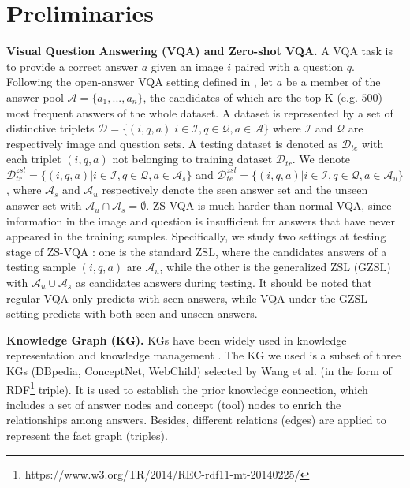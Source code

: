 \documentclass[runningheads]{llncs}
\newcommand{\cjy}[1]{{\color{black}#1}}
\newcommand{\jeff}[1]{{\color{black}#1}}
\begin{document}
\section{Preliminaries}
\noindent\textbf{Visual Question Answering (VQA) and Zero-shot VQA.} 
A VQA task is  to \jeff{provide} a correct answer $a$ given an image $i$ paired with a question $q$. 
Following the open-answer VQA setting defined in \cite{DBLP:conf/cvpr/HuCS18},   let $a$ be a member of the answer pool $\mathcal{A}=\{a_1, ...,a_n\}$, the candidates of which are the top K (e.g. $500$) most frequent answers of the whole dataset. 
A dataset is represented by a set of distinctive triplets $\mathcal{D} = \{(i, q, a) | i \in \mathcal{I}, q \in \mathcal{Q}, a \in \mathcal{A} \}$ where $\mathcal{I}$ and $\mathcal{Q}$ are respectively image and question sets.
\jeff{A} testing dataset is denoted as $\mathcal{D}_{te}$ with \cjy{each triplet $(i, q, a)$ not belonging to training dataset $\mathcal{D}_{tr}$.}
We denote $\mathcal{D}_{tr}^{zsl} = \{(i, q, a) | i \in \mathcal{I}, q \in \mathcal{Q}, a \in \mathcal{A}_s \}$ and $\mathcal{D}_{te}^{zsl} = \{(i, q, a) | i \in \mathcal{I}, q \in \mathcal{Q}, a \in \mathcal{A}_u \}$,
\cjy{where $\mathcal{A}_s$ and $\mathcal{A}_u$ respectively denote the seen answer set and the unseen answer set with $\mathcal{A}_u \cap \mathcal{A}_s = \emptyset$.}
\cjy{ZS-VQA is much harder than normal VQA, since information in the image and question is insufficient for answers that have never appeared in the training samples.}
Specifically, \cjy{we study two settings at testing stage of ZS-VQA : one is the standard ZSL, where the candidates answers of a testing sample $(i, q, a)$ are $\mathcal{A}_u$, 
while the other is the generalized ZSL (GZSL) with $\mathcal{A}_u \cup \mathcal{A}_s$ as candidates answers during testing. }
It should be noted that regular VQA only predicts with seen answers, while VQA under the GZSL setting predicts with both seen and unseen answers.


\noindent\textbf{Knowledge Graph (KG). }
KGs have been widely used in knowledge representation and knowledge management \cite{PVGW2017,PCEH+2017} .
The KG we used is a subset of three KGs (DBpedia, ConceptNet, WebChild) \jeff{selected} by Wang et al. \cite{DBLP:journals/pami/WangWSDH18} (in the form of RDF\footnote{https://www.w3.org/TR/2014/REC-rdf11-mt-20140225/} triple). It is used to establish the prior knowledge connection,
which includes a set of answer nodes and concept (tool) nodes to enrich the relationships among answers. 
Besides, different \cjy{relations (edges)} are applied to represent the \cjy{fact graph (triples).}
\end{document}
